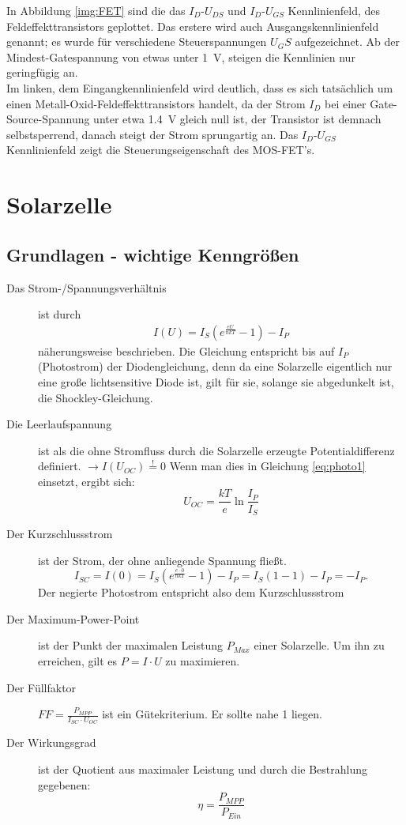 \documentclass[12pt,a4paper,ngerman]{report}
\begin{document}
	In Abbildung \ref{img:FET} sind die das $I_D$-$U_{DS}$ und $I_D$-$U_{GS}$ Kennlinienfeld, des Feldeffekttransistors geplottet. Das erstere wird auch Ausgangskennlinienfeld genannt; es wurde für verschiedene Steuerspannungen $U_GS$ aufgezeichnet. Ab der Mindest-Gatespannung von etwas unter \SI{1}{\volt}, steigen die Kennlinien nur geringfügig an.\\
	Im linken, dem Eingangkennlinienfeld wird deutlich, dass es sich tatsächlich um einen  Metall-Oxid-Feldeffekttransistors handelt, da der Strom $I_D$ bei einer Gate-Source-Spannung unter etwa \SI{1.4}{\volt} gleich null ist, der Transistor ist demnach selbstsperrend, danach steigt der Strom sprungartig an. Das $I_D$-$U_{GS}$ Kennlinienfeld zeigt die Steuerungseigenschaft des MOS-FET's.
	\section{Solarzelle}
		
		\subsection*{Grundlagen - wichtige Kenngrößen}
		\begin{description}
		\item[Das Strom-/Spannungsverhältnis] ist durch 
		\begin{eqnarray}\label{eq:photo1}
			I(U)=I_S\left( e^{\frac{eU}{nkT}} -1 \right) - I_P
		\end{eqnarray}
		näherungsweise beschrieben. Die Gleichung entspricht bis auf $I_P$ (Photostrom) der Diodengleichung, denn da eine Solarzelle eigentlich nur eine große lichtsensitive Diode ist, gilt für sie, solange sie abgedunkelt ist, die Shockley-Gleichung.
		\item[Die Leerlaufspannung] ist als die ohne Stromfluss durch die Solarzelle erzeugte Potentialdifferenz definiert. $\rightarrow I(U_{OC})\stackrel{!}{=}0$ Wenn man dies in Gleichung \ref{eq:photo1} einsetzt, ergibt sich:
		$$U_{OC}=\frac{kT}{e}\ln\frac{I_P}{I_S}$$
		\item[Der Kurzschlussstrom] ist der Strom, der ohne anliegende Spannung fließt.
		$$I_{SC}=I(0)=I_S\left( e^{\frac{e\cdot0}{nkT}} -1 \right) - I_P=I_S\left(1-1 \right) - I_P=-I_P.$$
		Der negierte Photostrom entspricht also dem Kurzschlussstrom
		\item[Der Maximum-Power-Point] ist der Punkt der maximalen Leistung $P_{Max}$ einer Solarzelle. Um ihn zu erreichen, gilt es $P=I\cdot U$ zu maximieren.
		\item[Der Füllfaktor] $FF=\frac{P_{MPP}}{I_{SC}\cdot U_{OC}}$ ist ein Gütekriterium. Er sollte nahe 1 liegen.
		\item[Der Wirkungsgrad] ist der Quotient aus maximaler Leistung und durch die Bestrahlung gegebenen:$$\eta=\frac{P_{MPP}}{P_{Ein}}$$
		\end{description}
\end{document}
